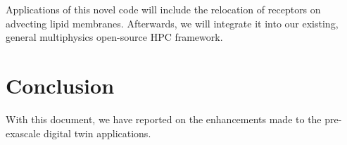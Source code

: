 \documentclass[a4paper,12pt]{article}
\begin{document}
Applications of this novel code will include the relocation of receptors on advecting lipid membranes.
Afterwards, we will integrate it into our existing, general multiphysics open-source HPC framework.
\newpage

\section{{Conclusion}} \label{sec:conclusion}

With this document, we have reported on the enhancements made to the pre-exascale digital twin applications.

\label{MyLastPage}
\end{document}
